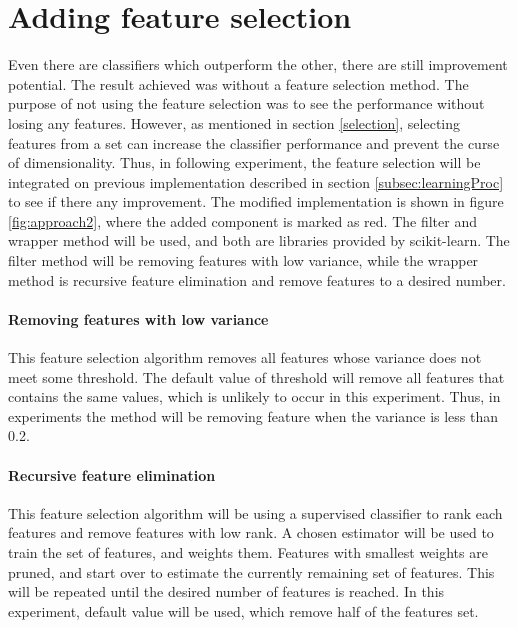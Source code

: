 \documentclass[USenglish]{ifimaster}  %
\begin{document}
	
	
	
\section{Adding feature selection}
Even there are classifiers which outperform the other, there are still improvement potential. The result achieved was without a feature selection method. The purpose of not using the feature selection was to see the performance without losing any features. However, as mentioned in section \ref{selection}, selecting features from a set can increase the classifier performance and prevent the curse of dimensionality. Thus, in following experiment, the feature selection will be integrated on previous implementation described in section \ref{subsec:learningProc} to see if there any improvement. The modified implementation is shown in figure \ref{fig:approach2}, where the added component is marked as red. The filter and wrapper method will be used, and both are libraries provided by scikit-learn. The filter method will be removing features with low variance, while the wrapper method is recursive feature elimination and remove features to a desired number. 

\paragraph{Removing features with low variance} \label{ap:variance}
This feature selection algorithm removes all features whose variance does not meet some threshold. The default value of threshold will remove all features that contains the same values, which is unlikely to occur in this experiment. Thus, in experiments the method will be removing feature when the variance is less than 0.2. 

\paragraph{Recursive feature elimination} \label{ap:rfe}
This feature selection algorithm will be using a supervised classifier to rank each features and remove features with low rank. A chosen estimator will be used to train the set of features, and weights them. Features with smallest weights are pruned, and start over to estimate the currently remaining set of features. This will be repeated until the desired number of features is reached. In this experiment, default value will be used, which remove half of the features set.
\end{document}
